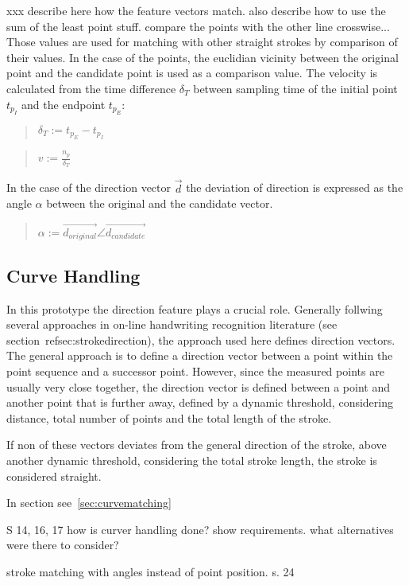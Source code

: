 xxx
describe here how the feature vectors match.
also describe how to use the sum of the least point stuff.
compare the points with the other line crosswise...
Those values are used for matching with other straight strokes by comparison
of their values. In the case of the points, the euclidian vicinity between
the original point and the candidate point is used as a comparison value.
The velocity is calculated from the time difference \( \delta_T \) between 
sampling time of the initial point \(t_{p_I}\) and the endpoint \(t_{p_E}\):
\begin{quote}
\(
    \delta_T :=
        t_{p_E} - t_{p_I}
\)
\end{quote}
\begin{quote}
\(
    v := \frac{n_p}{\delta_T}
\)
\end{quote}
In the case of the direction vector \(\vec{d}\) the deviation of direction is
expressed as the angle \( \alpha \) between the original and the candidate 
vector.
\begin{quote}
\(
    \alpha := \vec{d_{original}} \angle \vec{d_{candidate}}
\)
\end{quote}


\subsection{Curve Handling}
\label{sec:hwre:curvehandling}

In this prototype the direction feature plays a crucial role.
Generally follwing several approaches in on-line handwriting recognition
literature (see section~ref{sec:strokedirection}), the approach used here 
defines direction vectors.
The general approach is to define a direction vector between a point
within the point sequence and a successor point.
However, since the measured points are usually very close together, 
the direction vector is defined between a point and another point that 
is further away, defined by a dynamic threshold, considering distance,
total number of points and the total length of the stroke.

If non of these vectors deviates from the general direction of the stroke,
above another dynamic threshold, considering the total stroke length,
the stroke is considered straight.

In section
see~\ref{sec:curvematching}

S 14, 16, 17
how is curver handling done?
show requirements.
what alternatives were there to consider?

stroke matching with angles instead of point position.
s. 24

